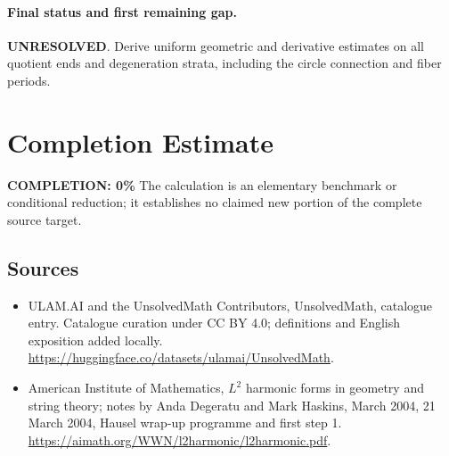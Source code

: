 \documentclass[11pt]{article}
\begin{document}
\paragraph{Final status and first remaining gap.}
\textbf{UNRESOLVED}. Derive uniform geometric and derivative estimates on all quotient ends and degeneration strata, including the circle connection and fiber periods.

\section{Completion Estimate}
\noindent\textbf{COMPLETION: 0\%}
The calculation is an elementary benchmark or conditional reduction; it establishes no claimed new portion of the complete source target.

\subsection{Sources}
\begin{itemize}
\item[\hypertarget{source:statement:1}{S1}] ULAM.AI and the UnsolvedMath Contributors, UnsolvedMath, catalogue entry. Catalogue curation under CC BY 4.0; definitions and English exposition added locally.
\url{https://huggingface.co/datasets/ulamai/UnsolvedMath}.
\item[\hypertarget{source:statement:2}{S2}] American Institute of Mathematics, $L^2$ harmonic forms in geometry and string theory; notes by Anda Degeratu and Mark Haskins, March 2004, 21 March 2004, Hausel wrap-up programme and first step 1.
\url{https://aimath.org/WWN/l2harmonic/l2harmonic.pdf}.
\end{itemize}
\label{end:statement}
\end{document}
